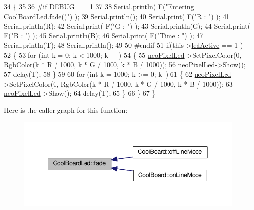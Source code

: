 \begin{DoxyCode}
34 \{
35 
36 \textcolor{preprocessor}{#if DEBUG == 1}
37 
38     Serial.println( F(\textcolor{stringliteral}{"Entering CoolBoardLed.fade()"}) );
39     Serial.println();
40     Serial.print( F(\textcolor{stringliteral}{"R : "}) );
41     Serial.println(R);
42     Serial.print( F(\textcolor{stringliteral}{"G : "}) );
43     Serial.println(G);
44     Serial.print( F(\textcolor{stringliteral}{"B : "}) );
45     Serial.println(B);
46     Serial.print( F(\textcolor{stringliteral}{"Time : "}) );
47     Serial.println(T);
48     Serial.println();
49 
50 \textcolor{preprocessor}{#endif  }
51     \textcolor{keywordflow}{if}(this->\hyperlink{classCoolBoardLed_a5f17c135516fcf4b44ea8a096ba0177a}{ledActive} == 1 )
52     \{
53         \textcolor{keywordflow}{for} (\textcolor{keywordtype}{int} k = 0; k < 1000; k++) 
54         \{
55             \hyperlink{classCoolBoardLed_ac2c13fa462a010cd9242bf297c013923}{neoPixelLed}->SetPixelColor(0, RgbColor(k * R / 1000, k * G / 1000, k * B / 1000));
56             \hyperlink{classCoolBoardLed_ac2c13fa462a010cd9242bf297c013923}{neoPixelLed}->Show();
57             delay(T);
58         \}
59         
60         \textcolor{keywordflow}{for} (\textcolor{keywordtype}{int} k = 1000; k >= 0; k--) 
61         \{
62             \hyperlink{classCoolBoardLed_ac2c13fa462a010cd9242bf297c013923}{neoPixelLed}->SetPixelColor(0, RgbColor(k * R / 1000, k * G / 1000, k * B / 1000));
63             \hyperlink{classCoolBoardLed_ac2c13fa462a010cd9242bf297c013923}{neoPixelLed}->Show();
64             delay(T);
65         \}
66     \}
67 \}
\end{DoxyCode}
Here is the caller graph for this function\+:
\nopagebreak
\begin{figure}[H]
\begin{center}
\leavevmode
\includegraphics[width=341pt]{classCoolBoardLed_af1cacbaa88db8bcf6042c1083ba41155_icgraph}
\end{center}
\end{figure}
\mbox{\label{classCoolBoardLed_ab778f5e7bed0ab74e3906d82110493c3}} 
